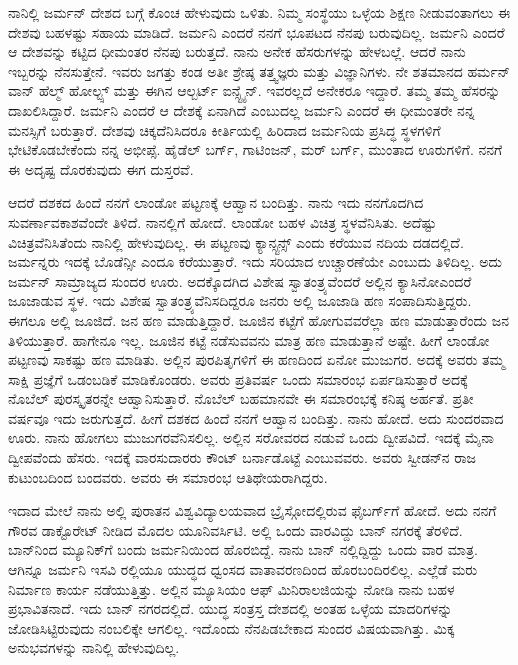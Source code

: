
ನಾನಿಲ್ಲಿ ಜರ್ಮನ್ ದೇಶದ ಬಗ್ಗೆ ಕೊಂಚ ಹೇಳುವುದು ಒಳಿತು. ನಿಮ್ಮ ಸಂಸ್ಥೆಯು ಒಳ್ಳೆಯ ಶಿಕ್ಷಣ ನೀಡುವಂತಾಗಲು ಈ ದೇಶವು ಬಹಳಷ್ಟು ಸಹಾಯ ಮಾಡಿದೆ. ಜರ್ಮನಿ ಎಂದರೆ ನನಗೆ ಭೂಪಟದ ನೆನಪು ಬರುವುದಿಲ್ಲ. ಜರ್ಮನಿ ಎಂದರೆ ಆ ದೇಶವನ್ನು ಕಟ್ಟಿದ ಧೀಮಂತರ ನೆನಪು ಬರುತ್ತದೆ. ನಾನು ಅನೇಕ ಹೆಸರುಗಳನ್ನು ಹೇಳಬಲ್ಲೆ. ಆದರೆ ನಾನು ಇಬ್ಬರನ್ನು ನೆನಸುತ್ತೇನೆ. ಇವರು ಜಗತ್ತು ಕಂಡ ಅತೀ ಶ್ರೇಷ್ಠ ತತ್ತ್ವಜ್ಞರು ಮತ್ತು ವಿಜ್ಞಾನಿಗಳು.  ನೇ ಶತಮಾನದ ಹರ್ಮನ್ ವಾನ್ ಹೆಲ್ಮ್ ‍ಹೋಲ್ಟ್ಸ್ ಮತ್ತು ಈಗಿನ ಆಲ್ಬರ್ಟ್ ಐನ್ಸ್ಟೈನ್. ಇವರಲ್ಲದೆ ಅನೇಕರೂ ಇದ್ದಾರೆ. ತಮ್ಮ ತಮ್ಮ ಹೆಸರನ್ನು ದಾಖಲಿಸಿದ್ದಾರೆ. ಜರ್ಮನಿ ಎಂದರೆ ಆ ದೇಶಕ್ಕೆ ಏನಾಗಿದೆ ಎಂಬುದಲ್ಲ ಜರ್ಮನಿ ಎಂದರೆ ಈ ಧೀಮಂತರೇ ನನ್ನ ಮನಸ್ಸಿಗೆ ಬರುತ್ತಾರೆ. ದೇಶವು ಚಿಕ್ಕದೆನಿಸಿದರೂ ಕೀರ್ತಿಯಲ್ಲಿ ಹಿರಿದಾದ ಜರ್ಮನಿಯ ಪ್ರಸಿದ್ಧ ಸ್ಥಳಗಳಿಗೆ ಭೇಟಿಕೊಡಬೇಕೆಂದು ನನ್ನ ಅಭೀಪ್ಸೆ. ಹೈಡೆಲ್ ಬರ್ಗ್, ಗಾಟಿಂಜನ್, ಮರ್ ಬರ್ಗ್, ಮುಂತಾದ ಊರುಗಳಿಗೆ. ನನಗೆ ಈ ಅದೃಷ್ಟ ದೊರಕುವುದು ಈಗ ದುಸ್ತರವೆ.

ಆದರೆ ದಶಕದ ಹಿಂದೆ ನನಗೆ ಲಾಂಡೋ ಪಟ್ಟಣಕ್ಕೆ ಆಹ್ವಾನ ಬಂದಿತ್ತು. ನಾನು ಇದು ನನಗೊದಗಿದ ಸುವರ್ಣಾವಕಾಶವೆಂದೇ ತಿಳಿದೆ. ನಾನಲ್ಲಿಗೆ ಹೋದೆ. ಲಾಂಡೋ ಬಹಳ ವಿಚಿತ್ರ ಸ್ಥಳವೆನಿಸಿತು. ಅದೆಷ್ಟು ವಿಚಿತ್ರವೆನಿಸಿತೆಂದು ನಾನಿಲ್ಲಿ ಹೇಳುವುದಿಲ್ಲ. ಈ ಪಟ್ಟಣವು ಕ್ಯಾನ್ಸ್ಟನ್ಸ್ ಎಂದು ಕರೆಯುವ ನದಿಯ ದಡದಲ್ಲಿದೆ. ಜರ್ಮನ್ನರು ಇದಕ್ಕೆ ಬೊಡೆನ್ಸೀ ಎಂದೂ ಕರೆಯುತ್ತಾರೆ. ಇದು ಸರಿಯಾದ ಉಚ್ಚಾರಣೆಯೇ ಎಂಬುದು ತಿಳಿದಿಲ್ಲ. ಅದು ಜರ್ಮನ್ ಸಾಮ್ರಾಜ್ಯದ ಸುಂದರ ಊರು. ಅದಕ್ಕೊದಗಿದ ವಿಶೇಷ ಸ್ವಾತಂತ್ರ್ಯವೆಂದರೆ ಅಲ್ಲಿನ ಕ್ಯಾಸಿನೋಎಂದರೆ ಜೂಜಾಡುವ ಸ್ಥಳ. ಇದು ವಿಶೇಷ ಸ್ವಾತಂತ್ರ್ಯವೆನಿಸದಿದ್ದರೂ ಜನರು ಅಲ್ಲಿ ಜೂಜಾಡಿ ಹಣ ಸಂಪಾದಿಸುತ್ತಿದ್ದರು. ಈಗಲೂ ಅಲ್ಲಿ ಜೂಜಿದೆ. ಜನ ಹಣ ಮಾಡುತ್ತಿದ್ದಾರೆ. ಜೂಜಿನ ಕಟ್ಟೆಗೆ ಹೋಗುವವರೆಲ್ಲಾ ಹಣ ಮಾಡುತ್ತಾರೆಂದು ಜನ ತಿಳಿಯುತ್ತಾರೆ. ಹಾಗೇನೂ ಇಲ್ಲ. ಜೂಜಿನ ಕಟ್ಟೆ ನಡೆಸುವವನು ಮಾತ್ರ ಹಣ ಮಾಡುತ್ತಾನೆ ಅಷ್ಟೇ. ಹೀಗೆ ಲಾಂಡೋ ಪಟ್ಟಣವು ಸಾಕಷ್ಟು ಹಣ ಮಾಡಿತು. ಅಲ್ಲಿನ ಪುರಪಿತೃಗಳಿಗೆ ಈ ಹಣದಿಂದ ಏನೋ ಮುಜುಗರ. ಅದಕ್ಕೆ ಅವರು ತಮ್ಮ ಸಾಕ್ಷಿ ಪ್ರಜ್ಞೆಗೆ ಒಡಂಬಡಿಕೆ ಮಾಡಿಕೊಂಡರು. ಅವರು ಪ್ರತಿವರ್ಷ ಒಂದು ಸಮಾರಂಭ ಏರ್ಪಡಿಸುತ್ತಾರೆ ಅದಕ್ಕೆ ನೊಬೆಲ್ ಪುರಸ್ಕೃತರನ್ನೇ ಆಹ್ವಾನಿಸುತ್ತಾರೆ. ನೊಬೆಲ್ ಬಹಮಾನವೇ ಈ ಸಮಾರಂಭಕ್ಕೆ ಕನಿಷ್ಠ ಅರ್ಹತೆ. ಪ್ರತೀ ವರ್ಷವೂ ಇದು ಜರುಗುತ್ತದೆ. ಹೀಗೆ ದಶಕದ ಹಿಂದೆ ನನಗೆ ಆಹ್ವಾನ ಬಂದಿತ್ತು. ನಾನು ಹೋದೆ. ಅದು ಸುಂದರವಾದ ಊರು. ನಾನು ಹೋಗಲು ಮುಜುಗರವೆನಿಸಲಿಲ್ಲ. ಅಲ್ಲಿನ ಸರೋವರದ ನಡುವೆ ಒಂದು ದ್ವೀಪವಿದೆ. ಇದಕ್ಕೆ ಮೈನಾ ದ್ವೀಪವೆಂದು ಹೆಸರು. ಇದಕ್ಕೆ ವಾರಸುದಾರರು ಕೌಂಟ್ ಬರ್ನಾಡೊಟ್ಟೆ ಎಂಬುವವರು. ಅವರು ಸ್ವೀಡನ್‍ನ ರಾಜ ಕುಟುಂಬದಿಂದ ಬಂದವರು. ಅವರು ಈ ಸಮಾರಂಭ ಆತಿಥೇಯರಾಗಿದ್ದರು.

\vskip 2pt

ಇದಾದ ಮೇಲೆ ನಾನು ಅಲ್ಲಿ ಪುರಾತನ ವಿಶ್ವವಿದ್ಯಾಲಯವಾದ ಬ್ರೈಸ್ಗೋದಲ್ಲಿರುವ ಫೈಬರ್ಗ್‌ಗೆ ಹೋದೆ. ಅದು ನನಗೆ ಗೌರವ ಡಾಕ್ಟೊರೇಟ್ ನೀಡಿದ ಮೊದಲ ಯೂನಿವರ್ಸಿಟಿ. ಅಲ್ಲಿ ಒಂದು ವಾರವಿದ್ದು ಬಾನ್ ನಗರಕ್ಕೆ ತೆರಳಿದೆ. ಬಾನ್‍ನಿಂದ ಮ್ಯೂನಿಕ್‍ಗೆ ಬಂದು ಜರ್ಮನಿಯಿಂದ ಹೊರಬಿದ್ದೆ. ನಾನು ಬಾನ್ ನಲ್ಲಿದ್ದಿದ್ದು ಒಂದು ವಾರ ಮಾತ್ರ. ಆಗಿನ್ನೂ ಜರ್ಮನಿ ಇಸವಿ ರಲ್ಲಿಯೂ ಯುದ್ಧದ ಧ್ವಂಸದ ವಾತಾವರಣದಿಂದ ಹೊರಬಂದಿರಲಿಲ್ಲ. ಎಲ್ಲೆಡೆ ಮರು ನಿರ್ಮಾಣ ಕಾರ್ಯ ನಡೆಯುತ್ತಿತ್ತು. ಅಲ್ಲಿನ ಮ್ಯೂಸಿಯಂ ಆಫ್ ಮಿನಿರಾಲಜಿಯನ್ನು ನೋಡಿ ನಾನು ಬಹಳ ಪ್ರಭಾವಿತನಾದೆ. ಇದು ಬಾನ್ ನಗರದಲ್ಲಿದೆ. ಯುದ್ಧ ಸಂತ್ರಸ್ತ ದೇಶದಲ್ಲಿ ಅಂತಹ ಒಳ್ಳೆಯ ಮಾದರಿಗಳನ್ನು ಜೋಡಿಸಿಟ್ಟಿರುವುದು ನಂಬಲಿಕ್ಕೇ ಆಗಲಿಲ್ಲ. ಇದೊಂದು ನೆನಪಿಡಬೇಕಾದ ಸುಂದರ ವಿಷಯವಾಗಿತ್ತು. ಮಿಕ್ಕ ಅನುಭವಗಳನ್ನು ನಾನಿಲ್ಲಿ ಹೇಳುವುದಿಲ್ಲ.

